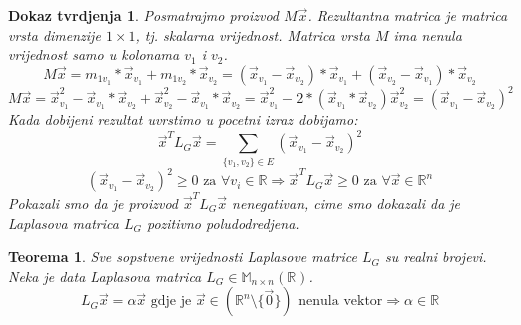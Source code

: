 \documentclass[11pt]{article}
\newtheorem{theorem}{Teorema}
\newtheorem*{custom_proof}{Dokaz tvrdjenja}
\begin{document}
\begin{custom_proof}
	Posmatrajmo proizvod $M \vec{x}$. Rezultantna matrica je matrica vrsta dimenzije $1 \times 1$, tj. skalarna vrijednost. Matrica vrsta $M$ ima nenula vrijednost samo u kolonama $v_1$ i $v_2$.
	\[
	M \vec{x} = m_{1 v_1} * \vec{x}_{v_1} + m_{1 v_2} * \vec{x}_{v_2} =  (\vec{x}_{v_1} - \vec{x}_{v_2}) * \vec{x}_{v_1} + (\vec{x}_{v_2} - \vec{x}_{v_1}) * \vec{x}_{v_2} 
	\] 
	\[
	M \vec{x} =  \vec{x}_{v_1}^2 - \vec{x}_{v_1} * \vec{x}_{v_2} + \vec{x}_{v_2}^2 - \vec{x}_{v_1} * \vec{x}_{v_2} = \vec{x}_{v_1}^2 - 2 *(\vec{x}_{v_1} * \vec{x}_{v_2}) \vec{x}_{v_2}^2 = (\vec{x}_{v_1} - \vec{x}_{v_2})^2   
	\] 
	Kada dobijeni rezultat uvrstimo u pocetni izraz dobijamo:
	\[
	  \vec{x}^TL_G\vec{x} = \sum_{\{v_1,v_2\} \in E} (\vec{x}_{v_1} - \vec{x}_{v_2})^2
	\]
	\[
	  (\vec{x}_{v_1} - \vec{x}_{v_2})^2 \geq 0 \text{ za } \forall v_i \in \mathbb{R} \Rightarrow \vec{x}^TL_G\vec{x} \geq 0 \text{ za } \forall \vec{x} \in \mathbb{R}^n
	\]
	Pokazali smo da je proizvod $\vec{x}^TL_G\vec{x}$ nenegativan, cime smo dokazali da je Laplasova matrica $L_G$ pozitivno poludodredjena.
	\end{custom_proof}
	
	\begin{theorem} Sve sopstvene vrijednosti Laplasove matrice $L_G$ su realni brojevi.
	Neka je data Laplasova matrica $L_G \in  \mathbb{M}_{n \times n}(\mathbb{R})$.
	\[
	 L_G\vec{x} = \alpha \vec{x} \text{ gdje je } \vec{x} \in ( \mathbb{R}^n \setminus \{\vec{0}\}) \text{ nenula vektor} \Rightarrow \alpha \in \mathbb{R}
	\]
	\end{theorem}
	
\end{document}
